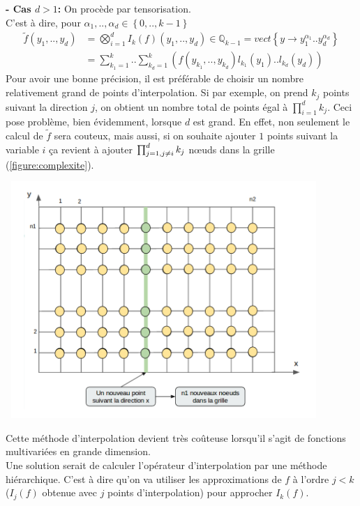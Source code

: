 \vspace{1cm}
\hspace{0.5cm}
\textbf{ - Cas $d>1$: }
On procède par tensorisation. \\
C'est à dire, pour $\alpha_1,..,\alpha_d \in \left \{0,.., k-1 \right \}$ \\
\begin{align}
   \tilde{f} (y_1,..,y_d)& = \bigotimes_{i=1}^d I_k (f)(y_1,..,y_d) \in \mathbb{Q}_{k-1} = vect \left \{ y \rightarrow y_1^{\alpha_1}..y_d^{\alpha_d} \right \} \nonumber \\
	 & = \sum_{k_1=1}^k..\sum_{k_d=1}^k (f(y_{k_1},..,y_{k_d}) l_{k_1}(y_1)..l_{k_d}(y_d)) \nonumber
\end{align}
\hspace{0.5cm}
Pour avoir une bonne précision, il est préférable de choisir un nombre relativement grand de points d'interpolation.
Si par exemple, on prend $k_j$ points suivant la direction $j$, on obtient un nombre total de points égal à $\prod_{i=1}^d k_j$.
Ceci pose problème, bien évidemment, lorsque $d$ est grand. En effet, non seulement le calcul de $\tilde{f}$ sera couteux, mais aussi,
si on souhaite ajouter $1$ points suivant la variable $i$ ça revient à ajouter $\prod_{j=1,\\ j \neq i}^d k_j$ nœuds dans la grille (\ref{figure:complexite}).
\begin{center}
\includegraphics[height=9cm,width=12cm]{images/grille.png}
\label{figure:complexite}
\end{center}
Cette méthode d'interpolation devient très coûteuse lorsqu'il s'agit de fonctions multivariées en grande dimension.\\
Une solution serait de calculer l'opérateur d'interpolation par une méthode hiérarchique. C'est à dire qu'on va utiliser les approximations de $f$ à l'ordre $j<k$ ($I_{j}(f)$ obtenue avec $j$ points d'interpolation) pour approcher $I_{k}(f)$.


